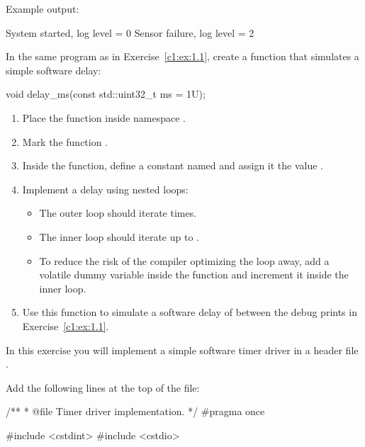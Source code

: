 \noindent Example output:

\begin{console}
System started, log level = 0
Sensor failure, log level = 2
\end{console}

\label{c1:ex:1.2}
In the same program as in Exercise~\ref{c1:ex:1.1}, create a function that simulates a simple
software delay:

\begin{cppcode}
void delay_ms(const std::uint32_t ms = 1U);
\end{cppcode}

\begin{enumerate}
  \item Place the function inside namespace .
  \item Mark the function .
  \item Inside the function, define a  constant named  and assign it
    the value .
  \item Implement a delay using nested loops:
  \begin{itemize}
    \item The outer loop should iterate  times.
    \item The inner loop should iterate up to .
    \item To reduce the risk of the compiler optimizing the loop away, add a volatile dummy variable
       inside the function and increment it inside the inner
      loop.
  \end{itemize}
  \item Use this function to simulate a software delay of  between the debug prints in
    Exercise~\ref{c1:ex:1.1}.
\end{enumerate}

\label{c1:set:2}

\label{c1:ex:2.1}
In this exercise you will implement a simple software timer driver  in a header
file .

Add the following lines at the top of the file:

\begin{cppcode}
/**
 * @file Timer driver implementation.
 */
#pragma once

#include <cstdint>
#include <cstdio>
\end{cppcode}

